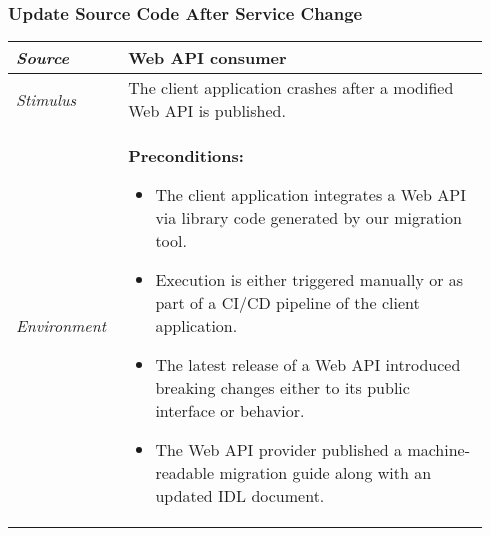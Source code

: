 \subsubsection{Update Source Code After Service Change}
\label{subsubsec:UseCase:FixClientApp}

\vspace{-2mm}
\begin{center}
    \def\arraystretch{1.5}
    \begin{longtable}{ p{0.22\linewidth} p{0.72\linewidth} }
    \hline
        \textit{Source} & Web API consumer\\
    \hline
        \textit{Stimulus} & The client application crashes after a modified Web API is published.\\
    \hline
    	\textit{Environment} & \textbf{Preconditions:} 
    	\begin{itemize}
    		\item The client application integrates a Web API via library code generated by our migration tool. 
    		\item Execution is either triggered manually or as part of a CI/CD pipeline of the client application. 
    		\item The latest release of a Web API introduced breaking changes either to its public interface or behavior. 
    		\item The Web API provider published a machine-readable migration guide along with an updated IDL document.
    	\end{itemize}
    	

\end{longtable}
\end{center}
